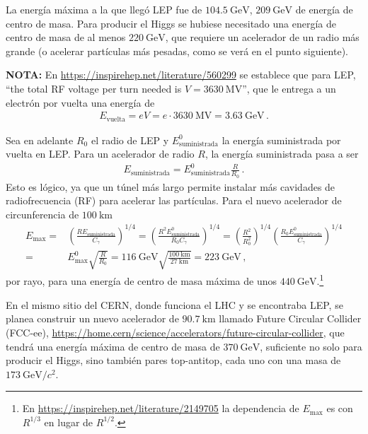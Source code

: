\documentclass[12pt, a4paper]{article}
\begin{document}
\begin{solution}
La energía máxima a la que llegó LEP fue de $\qty{104.5}{\giga\electronvolt}$, $\qty{209}{\giga\electronvolt}$ de energía de centro de masa. Para producir el Higgs se hubiese necesitado una energía de centro de masa de al menos $\qty{220}{\giga\electronvolt}$, que requiere un acelerador de un radio más grande (o acelerar partículas más pesadas, como se verá en el punto siguiente).

\textbf{NOTA:} En \url{https://inspirehep.net/literature/560299} se establece que para LEP, ``the total RF voltage per turn needed is $V =\qty{3630}{\mega\volt}$'', que le entrega a un electrón por vuelta una energía de
\begin{align*}
    E_{\text{vuelta}} = e V = e\cdot \qty{3630}{\mega\volt} = \qty{3.63}{\giga\electronvolt}\,.
\end{align*}

Sea en adelante $R_0$ el radio de LEP y $E^0_{\text{suministrada}}$ la energía suministrada por vuelta en LEP. Para un acelerador de radio $R$, la energía suministrada pasa a ser
\begin{align*}
    E_{\text{suministrada}} = E^0_{\text{suministrada}}\frac{R}{R_0}\,.
\end{align*}
Esto es lógico, ya que un túnel más largo permite instalar más cavidades de radiofrecuencia (RF) para acelerar las partículas.
Para el nuevo acelerador de circunferencia de $\qty{100}{\kilo\meter}$
\begin{align*}
    E_{\text{max}} =&\left( \frac{R E_{\text{suministrada}} }{C_\gamma}\right)^{1/4}
     = \left(\frac{R^2 E^0_{\text{suministrada}}}{R_0 C_\gamma}\right)^{1/4}
     = \left(\frac{R^2 }{R_0^2}\right)^{1/4}\left(\frac{R_0 E^0_{\text{suministrada}}}{ C_\gamma}\right)^{1/4}\\
    =& E^0_{\text{max}}\sqrt{\frac{R}{R_0}}
    = \qty{116}{\giga\electronvolt}\sqrt{\frac{\qty{100}{\kilo\meter}}{\qty{27}{\kilo\meter}}}
    = \qty{223}{\giga\electronvolt}\,,
\end{align*}
por rayo, para una energía de centro de masa máxima de unos $\qty{440}{\giga\electronvolt}$.\footnote{En \url{https://inspirehep.net/literature/2149705} la dependencia de $E_{\text{max}}$ es con $R^{1/3}$ en lugar de $R^{1/2}$.}

En el mismo sitio del CERN, donde funciona el LHC y se encontraba LEP, se planea construir un nuevo acelerador de $\qty{90.7}{\kilo\meter}$ llamado Future Circular Collider (FCC-ee), \url{https://home.cern/science/accelerators/future-circular-collider}, que tendrá una energía máxima de centro de masa de $\qty{370}{\giga\electronvolt}$, suficiente no solo para producir el Higgs, sino también pares top-antitop, cada uno con una masa de $\qty{173}{\giga\electronvolt}/c^2$.
\end{solution}
\end{document}
